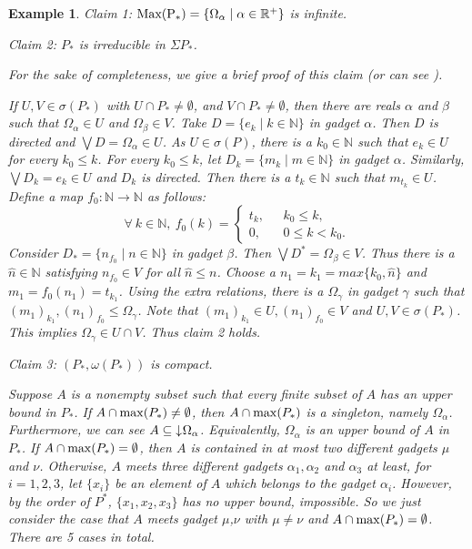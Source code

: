 \documentclass[preprint,12pt]{elsarticle}
\numberwithin{equation}{section}
\newtheorem{example}[theorem]{Example}
\newcommand{\dn}{\mathord{\downarrow}\hspace{0.05em}}
\begin{document}
\begin{example}
{Claim 1: ${\rm Max(P_{\ast})}=\{\Omega_{\alpha}\mid \alpha \in\mathbb{R}^{+}\}$ is infinite.

Claim 2: $P_{\ast}$ is irreducible in $\Sigma P_{\ast}$.

For the sake of completeness, we give a brief proof of this claim (or can see \cite{IJ82}).

If $U,V\in\sigma(P_{\ast})$ with $U\cap P_{\ast}\neq\emptyset$, and $V\cap P_{\ast}\neq\emptyset$, then there are reals $\alpha$ and $\beta$ such that $\Omega_{\alpha}\in U$ and $\Omega_{\beta}\in V$.
Take $D=\{e_{k}\mid k\in\mathbb{N}\}$ in gadget $\alpha$. Then $D$ is directed and $\bigvee D=\Omega_{\alpha}\in U$. As $U\in\sigma(P)$, there is a $k_{0}\in\mathbb{N}$ such that $e_{k}\in U$ for every $k_{0}\leq k$. For every  $k_{0}\leq k$, let $D_{k}=\{m_{k}\mid m\in\mathbb{N}\}$ in gadget $\alpha$. Similarly, $\bigvee D_{k}=e_{k}\in U$ and $D_{k}$ is directed. Then there is a $t_{k}\in \mathbb{N}$ such that $m_{t_{k}}\in U$. Define a map $f_{0}:\mathbb{N}\longrightarrow\mathbb{N}$ as follows:
$$\forall \ k\in\mathbb{N}, \ f_{0}(k)=\left\{
             \begin{array}{ll}
              t_{k}, &\ \ \  k_{0}\leq k, \\
               0, &\ \ \ 0\leq k< k_{0}.
             \end{array}
           \right.$$
Consider $D_{\ast}=\{n_{f_{0}}\mid n\in\mathbb{N}\}$ in gadget $\beta$. Then $\bigvee D^{\ast}=\Omega_{\beta}\in V$. Thus there is a $\hat{n}\in \mathbb{N}$ satisfying $n_{f_{0}}\in V$ for all $\hat{n}\leq n$. Choose a $n_{1}=k_{1}=max\{k_{0},\hat{n}\}$ and $m_{1}=f_{0}(n_{1})=t_{k_{1}}$. Using the extra relations, there is a $\Omega_{\gamma}$ in gadget $\gamma$ such that $(m_{1})_{k_{1}},(n_{1})_{f_{0}}\leq\Omega_{\gamma}$. Note that
$(m_{1})_{k_{1}}\in U,(n_{1})_{f_{0}}\in V$ and $U,V\in\sigma(P_{\ast})$. This implies $\Omega_{\gamma}\in U\cap V$. Thus claim 2 holds.

Claim 3: $(P_{\ast},\omega(P_{\ast}))$ is compact.

Suppose $A$ is a nonempty subset such that every finite subset of $A$ has an upper bound in $P_{\ast}$. If $A\cap {\rm max}(P_{\ast})\neq\emptyset$, then $A\cap {\rm max}(P_{\ast})$ is a singleton, namely $\Omega_{\alpha}$. Furthermore, we can see $A\subseteq\dn \Omega_{\alpha}$. Equivalently, $\Omega_{\alpha}$ is an upper bound of $A$ in $P_{\ast}$. If $A\cap {\rm max}(P_{\ast})=\emptyset$, then $A$ is contained in at most two different gadgets $\mu$ and $\nu$. Otherwise, $A$ meets three different gadgets $\alpha_{1},\alpha_{2}$ and $\alpha_{3}$ at least, for $i=1,2,3$, let $\{x_{i}\}$ be an element of $A$ which belongs to the gadget $\alpha_{i}$. However, by the order of $P^{\ast}$, $\{x_{1},x_{2},x_{3}\}$ has no upper bound, impossible. So we just consider the case that $A$ meets gadget $\mu$,$\nu$ with $\mu\neq\nu$ and $A\cap {\rm max}(P_{\ast})=\emptyset$. There are 5 cases in total.

}
\end{example}
\end{document}
